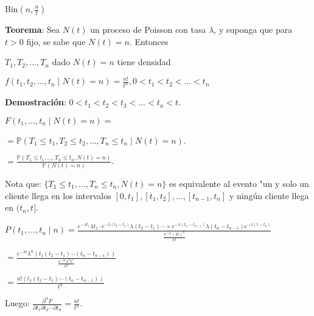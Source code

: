 \documentclass[12pt]{article}
\begin{document}
\begin{center}
\end{center}

Bin$(n, \frac{u}{t})$

\textbf{Teorema}: Sea $N(t)$ un proceso de Poisson con tasa $\lambda$, y suponga que para $t > 0$ fijo, se sabe que $N(t) = n$. Entonces

$T_1, T_2, \ldots, T_n$ dado $N(t) = n$ tiene densidad

$f(t_1, t_2, \ldots, t_n \mid N(t) = n) = \frac{n!}{t^n}, 0 < t_1 < t_2 < \ldots < t_n$

\textbf{Demostración}: $0 < t_1 < t_2 < t_3 < \ldots < t_n < t$.

$F(t_1, \ldots, t_n \mid N(t) = n) =$

$= \mathbb{P}(T_1 \leq t_1, T_2 \leq t_2, \ldots, T_n \leq t_n \mid N(t) = n)$.

$= \frac{\mathbb{P}(T_1 \leq t_1, \ldots, T_n \leq t_n, N(t) = n)}{\mathbb{P}(N(t) = n)}$.

Nota que: $\{T_1 \leq t_1, \ldots, T_n \leq t_n, N(t) = n\}$ es equivalente al evento "un y solo un cliente llega en los intervalos $[0, t_1], [t_1, t_2], \ldots, [t_{n-1}, t_n]$ y ningún cliente llega en $(t_n, t]$.

$P(t_1, \ldots, t_n \mid n) = \frac{e^{-\lambda t_1} \lambda t_1 \cdot e^{-\lambda(t_2-t_1)} \lambda(t_2-t_1) \cdots \times e^{-\lambda(t_n-t_{n-1})} \lambda(t_n-t_{n-1}) e^{-\lambda(t-t_n)}}{\frac{e^{-\lambda t} (\lambda t)^n}{n!}}$

$= \frac{e^{-\lambda t} \lambda^n (t_1(t_2-t_1)\cdots(t_n-t_{n-1}))}{\frac{e^{-\lambda t} \lambda^n t^n}{n!}}$

$= \frac{n! (t_1(t_2-t_1)\cdots(t_n-t_{n-1}))}{t^n}$

Luego: $\frac{\partial^n F}{\partial t_1 \partial t_2 \cdots \partial t_n} = \frac{n!}{t^n}$.
\end{document}
